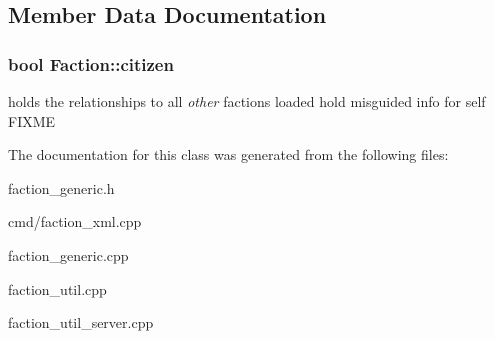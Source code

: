 \subsection{Member Data Documentation}
\subsubsection[{\texorpdfstring{citizen}{citizen}}]{\setlength{\rightskip}{0pt plus 5cm}bool Faction\+::citizen}\hypertarget{classFaction_aa3709d8463a31af0232e5e329ac462a2}{}\label{classFaction_aa3709d8463a31af0232e5e329ac462a2}
holds the relationships to all {\itshape other} factions loaded hold misguided info for self F\+I\+X\+ME 

The documentation for this class was generated from the following files\+:\begin{DoxyCompactItemize}
\item 
faction\+\_\+generic.\+h\item 
cmd/faction\+\_\+xml.\+cpp\item 
faction\+\_\+generic.\+cpp\item 
faction\+\_\+util.\+cpp\item 
faction\+\_\+util\+\_\+server.\+cpp\end{DoxyCompactItemize}
